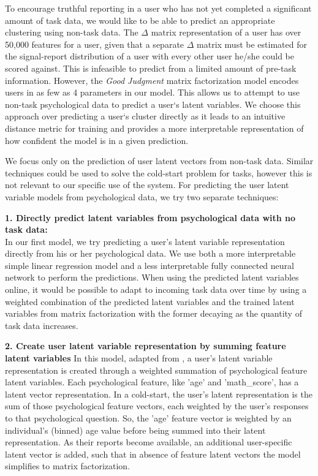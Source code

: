 \documentclass{article}
\begin{document}
           
To encourage truthful reporting in a user who has not yet completed a significant amount of task data, we would like to be able to predict an appropriate clustering using non-task data. The $\Delta$ matrix representation of a user has over 50,000 features for a user, given that a separate $\Delta$ matrix must be estimated for the signal-report distribution of a user with every other user he/she could be scored against. This is infeasible to predict from a limited amount of pre-task information. However, the \emph{Good Judgment} matrix factorization model encodes users in as few as 4 parameters in our model. This allows us to attempt to use non-task psychological data to predict a user`s latent variables. We choose this approach over predicting a user`s cluster directly as it leads to an intuitive distance metric for training and provides a more interpretable representation of how confident the model is in a given prediction.

We focus only on the prediction of user latent vectors from non-task data. Similar techniques could be used to solve the cold-start problem for tasks, however this is not relevant to our specific use of the system. For predicting the user latent variable models from psychological data, we try two separate techniques: 

\noindent\textbf{1. Directly predict latent variables from psychological data with no task data: } \\
In our first model, we try predicting a user's latent variable representation directly from his or her psychological data. We use both a more interpretable simple linear regression model and a less interpretable fully connected neural network to perform the predictions. When using the predicted latent variables online, it would be possible to adapt to incoming task data over time by using a weighted combination of the predicted latent variables and the trained latent variables from matrix factorization with the former decaying as the quantity of task data increases. 

\noindent\textbf{2. Create user latent variable representation by summing feature latent variables} In this model, adapted from \citep{kula2015metadata}, a user's latent variable representation is created through a weighted summation of psychological feature latent variables. Each psychological feature, like 'age' and 'math\_score', has a latent vector representation. In a cold-start, the user's latent representation is the sum of those psychological feature vectors, each weighted by the user's responses to that psychological question. So, the 'age' feature vector is weighted by an individual's (binned) age value before being summed into their latent representation. As their reports become available, an additional user-specific latent vector is added, such that in absence of feature latent vectors the model simplifies to matrix factorization. 
\end{document}
